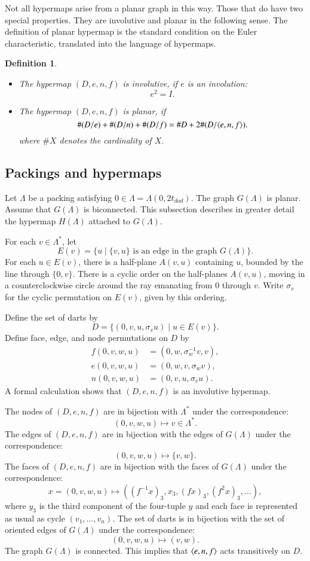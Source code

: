 \documentclass{article} %
\newtheorem{definition}[lemma]{Definition}
\begin{document}
Not all hypermaps arise from a planar graph in this way.
Those that do have two special properties.  They are involutive
and planar in the following sense.   The definition
of planar hypermap is the standard condition on the Euler
characteristic, translated into the language of hypermaps.

\begin{definition}\label{def:involutive}
\mbox{}
\begin{itemize}
\item The hypermap $(D,e,n,f)$ is involutive, if $e$ is an involution:
$$
 e^2 = I.
$$
\item The hypermap $(D,e,n,f)$ is planar, if
   $$
   \#(D/e) + \#(D/n) + \#(D/f) = \# D + 2\#(D/\langle e,n,f\rangle).
   $$
where $\# X$ denotes the cardinality of $X$.
\end{itemize}
\end{definition}

\subsection{Packings and hypermaps}\label{sec:ph}

Let $\Lambda$ be a packing satisfying $0\in\Lambda=\Lambda(0,2t_{dod})$.  The graph
$G(\Lambda)$ is planar.   Assume that $G(\Lambda)$ is biconnected. 
This subsection describes in greater detail the
hypermap $H(\Lambda)$ attached to $G(\Lambda)$.

For each $v\in \Lambda^*$, let 
  $$E(v) = \{u \mid \{v,u\} \text{ is an edge in the graph } G(\Lambda)\}.$$
For each $u\in E(v)$, there is a half-plane $A(v,u)$ containing $u$, bounded by
the line through $\{0,v\}$.  There is a cyclic order on the half-planes $A(v,u)$,
moving in a counterclockwise circle around the ray emanating from $0$ through $v$.
Write $\sigma_v$ for the cyclic permutation on $E(v)$, given by this ordering.

Define the set of darts by
$$
D = \{(0,v,u,\sigma_v u) \mid u\in E(v)\}.
$$
Define face, edge, and node permutations on $D$ by
$$
\begin{array}{lll}
  f(0,v,w,u) &= (0,w,\sigma_w^{-1} v,v),\\
  e(0,v,w,u) &= (0,w,v,\sigma_w v),\\
  n(0,v,w,u) &= (0,v,u,\sigma_v u).
\end{array}
$$
A formal calculation shows that $(D,e,n,f)$ is an involutive hypermap.

The nodes of $(D,e,n,f)$ are in bijection with $\Lambda^*$ under the correspondence:
$$
  (0,v,w,u) \mapsto v\in\Lambda^*.
$$
The edges of $(D,e,n,f)$ are in bijection with the edges of $G(\Lambda)$ under the
correspondence:
$$
  (0,v,w,u) \mapsto \{v,w\}.
$$
The faces of $(D,e,n,f)$ are in bijection with the faces of $G(\Lambda)$ under the
correspondence:
$$
  x = (0,v,w,u) \mapsto ((f^{-1}x)_3,x_3,(f x)_3,(f^2 x)_3,\ldots),
$$
where $y_3$ is the third component of the four-tuple $y$ and each face is represented
as usual as cycle $(v_1,\ldots,v_n)$.
The set of darts is in bijection with the set of oriented edges of $G(\Lambda)$ under
the correspondence:
$$
(0,v,w,u)\mapsto (v,w).
$$
The graph $G(\Lambda)$ is connected.  This implies that $\langle e,n,f\rangle$ acts
transitively on $D$.
\end{document}
